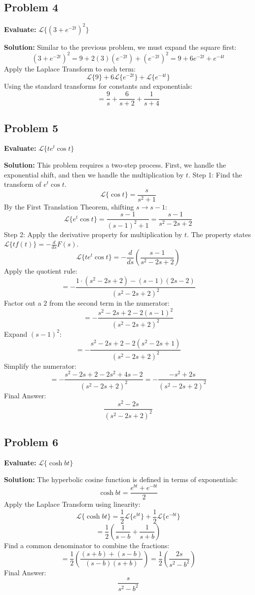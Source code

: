 \documentclass[11pt, a4paper]{article}
\theoremstyle{definition}
\theoremstyle{remark}
\begin{document}
\subsection{Problem 4}
\textbf{Evaluate:} $\mathscr{L}\{(3 + e^{-2t})^2\}$

\textbf{Solution:}
Similar to the previous problem, we must expand the square first:
\[
(3 + e^{-2t})^2 = 9 + 2(3)(e^{-2t}) + (e^{-2t})^2 = 9 + 6e^{-2t} + e^{-4t}
\]
Apply the Laplace Transform to each term:
\[
\mathscr{L}\{9\} + 6\mathscr{L}\{e^{-2t}\} + \mathscr{L}\{e^{-4t}\}
\]
Using the standard transforms for constants and exponentials:
\[
= \frac{9}{s} + \frac{6}{s+2} + \frac{1}{s+4}
\]

\subsection{Problem 5}
\textbf{Evaluate:} $\mathscr{L}\{t e^t \cos t\}$

\textbf{Solution:}
This problem requires a two-step process. First, we handle the exponential shift, and then we handle the multiplication by $t$.
Step 1: Find the transform of $e^t \cos t$.
\[
\mathscr{L}\{\cos t\} = \frac{s}{s^2 + 1}
\]
By the First Translation Theorem, shifting $s \to s-1$:
\[
\mathscr{L}\{e^t \cos t\} = \frac{s-1}{(s-1)^2 + 1} = \frac{s-1}{s^2 - 2s + 2}
\]
Step 2: Apply the derivative property for multiplication by $t$. The property states $\mathscr{L}\{t f(t)\} = -\frac{d}{ds} F(s)$.
\[
\mathscr{L}\{t e^t \cos t\} = -\frac{d}{ds} \left( \frac{s-1}{s^2 - 2s + 2} \right)
\]
Apply the quotient rule:
\[
= -\frac{1 \cdot (s^2 - 2s + 2) - (s-1)(2s - 2)}{(s^2 - 2s + 2)^2}
\]
Factor out a $2$ from the second term in the numerator:
\[
= -\frac{s^2 - 2s + 2 - 2(s-1)^2}{(s^2 - 2s + 2)^2}
\]
Expand $(s-1)^2$:
\[
= -\frac{s^2 - 2s + 2 - 2(s^2 - 2s + 1)}{(s^2 - 2s + 2)^2}
\]
Simplify the numerator:
\[
= -\frac{s^2 - 2s + 2 - 2s^2 + 4s - 2}{(s^2 - 2s + 2)^2} = -\frac{-s^2 + 2s}{(s^2 - 2s + 2)^2}
\]
Final Answer:
\[
\frac{s^2 - 2s}{(s^2 - 2s + 2)^2}
\]

\subsection{Problem 6}
\textbf{Evaluate:} $\mathscr{L}\{\cosh bt\}$

\textbf{Solution:}
The hyperbolic cosine function is defined in terms of exponentials:
\[
\cosh bt = \frac{e^{bt} + e^{-bt}}{2}
\]
Apply the Laplace Transform using linearity:
\[
\mathscr{L}\{\cosh bt\} = \frac{1}{2} \mathscr{L}\{e^{bt}\} + \frac{1}{2} \mathscr{L}\{e^{-bt}\}
\]
\[
= \frac{1}{2} \left( \frac{1}{s-b} + \frac{1}{s+b} \right)
\]
Find a common denominator to combine the fractions:
\[
= \frac{1}{2} \left( \frac{(s+b) + (s-b)}{(s-b)(s+b)} \right) = \frac{1}{2} \left( \frac{2s}{s^2 - b^2} \right)
\]
Final Answer:
\[
\frac{s}{s^2 - b^2}
\]
\end{document}
